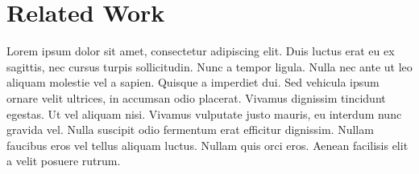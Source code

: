 \section{Related Work}

Lorem ipsum dolor sit amet, consectetur adipiscing elit. Duis luctus erat eu ex sagittis, nec cursus turpis sollicitudin. Nunc a tempor ligula. Nulla nec ante ut leo aliquam molestie vel a sapien. Quisque a imperdiet dui. Sed vehicula ipsum ornare velit ultrices, in accumsan odio placerat. Vivamus dignissim tincidunt egestas. Ut vel aliquam nisi. Vivamus vulputate justo mauris, eu interdum nunc gravida vel. Nulla suscipit odio fermentum erat efficitur dignissim. Nullam faucibus eros vel tellus aliquam luctus. Nullam quis orci eros. Aenean facilisis elit a velit posuere rutrum. 